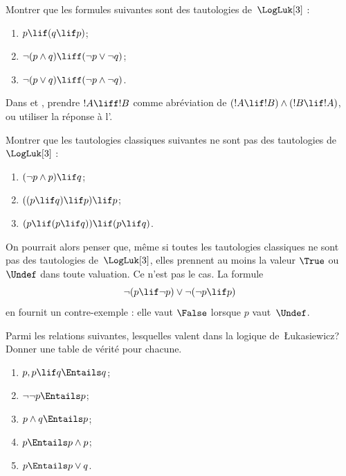 \documentclass[../../../include/open-logic-section]{subfiles}
\begin{document}
\begin{prob}
  Montrer que les formules suivantes
  sont des tautologies de~$\LogLuk[3]$ :
  \begin{enumerate}
    \item $p\lif(q\lif p)$;
    \item\label{mvl:thr:luk:prob:luk-taut-2}
      $\lnot(p\land q)\liff
      (\lnot p\lor\lnot q)$;
    \item\label{mvl:thr:luk:prob:luk-taut-3}
      $\lnot(p\lor q)\liff
      (\lnot p\land\lnot q)$.
  \end{enumerate}
  Dans 
  et ,
  prendre $!A\liff !B$ comme abréviation
  de $(!A\lif !B)\land(!B\lif !A)$,
  ou utiliser la réponse à
  l'.
\end{prob}

\begin{prob}
  Montrer que les tautologies classiques
  suivantes ne sont pas des tautologies
  de~$\LogLuk[3]$ :
  \begin{enumerate}
    \item $(\lnot p\land p)\lif q$;
    \item $((p\lif q)\lif p)\lif p$;
    \item $(p\lif(p\lif q))\lif(p\lif q)$.
  \end{enumerate}
\end{prob}

On pourrait alors penser que, même si
toutes les tautologies classiques ne
sont pas des tautologies de~$\LogLuk[3]$,
elles prennent au moins la valeur
$\True$ ou $\Undef$ dans toute
valuation. Ce n'est pas le cas.
La formule
\[
  \lnot(p\lif\lnot p)
  \lor\lnot(\lnot p\lif p)
\]
en fournit un contre-exemple :
elle vaut $\False$ lorsque
$p$ vaut~$\Undef$.

\begin{prob}
  Parmi les relations suivantes,
  lesquelles valent dans la logique
  de~\L ukasiewicz? Donner une table
  de vérité pour chacune.
  \begin{enumerate}
    \item $p,p\lif q\Entails q$;
    \item $\lnot\lnot p\Entails p$;
    \item $p\land q\Entails p$;
    \item $p\Entails p\land p$;
    \item $p\Entails p\lor q$.
  \end{enumerate}
\end{prob}
\end{document}
